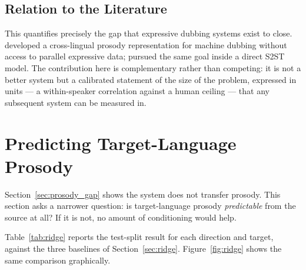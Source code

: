 \subsection{Relation to the Literature}

This quantifies precisely the gap that expressive dubbing systems exist to close.
 developed a cross-lingual prosody representation for machine
dubbing without access to parallel expressive data;  pursued the same goal
inside a direct S2ST model. The contribution here is complementary rather than competing: it is not
a better system but a calibrated statement of the size of the problem, expressed in units --- a
within-speaker correlation against a human ceiling --- that any subsequent system can be measured
in.

\section{Predicting Target-Language Prosody}
\label{sec:ridge_result}

Section~\ref{sec:prosody_gap} shows the system does not transfer prosody. This section asks a
narrower question: is target-language prosody \emph{predictable} from the source at all? If it is
not, no amount of conditioning would help.

Table~\ref{tab:ridge} reports the test-split result for each direction and target, against the
three baselines of Section~\ref{sec:ridge}. Figure~\ref{fig:ridge} shows the same comparison
graphically.


